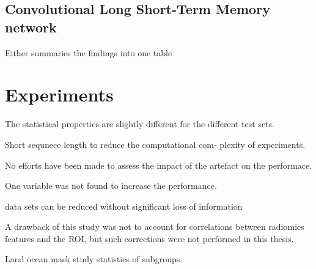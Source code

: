 \subsection{Convolutional Long Short-Term Memory network}
Either summaries the findings into one table 


\section{Experiments}



The statistical properties are slightly different for the different test sets.  

Short sequnece length to reduce the computational com-
plexity of experiments. 

No efforts have been made to assess the impact of the artefact on the performace.

One variable was not found to increase the performance.


data sets can be reduced without significant loss of information

A drawback of this study was not to account for correlations between radiomics features and the ROI, but such corrections were
not performed in this thesis.

Land ocean mask study statistics of subgroups.


